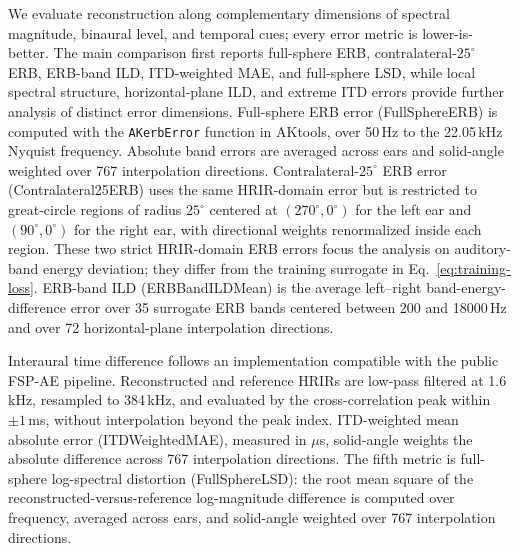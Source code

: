 \documentclass[UTF8,a4paper]{article}
\begin{document}
We evaluate reconstruction along complementary dimensions of spectral magnitude, binaural level, and temporal cues; every error metric is lower-is-better. The main comparison first reports full-sphere ERB, contralateral-$25^\circ$ ERB, ERB-band ILD, ITD-weighted MAE, and full-sphere LSD, while local spectral structure, horizontal-plane ILD, and extreme ITD errors provide further analysis of distinct error dimensions. Full-sphere ERB error (FullSphereERB) is computed with the \texttt{AKerbError} function in AKtools\cite{R12}, over 50\,Hz to the 22.05\,kHz Nyquist frequency. Absolute band errors are averaged across ears and solid-angle weighted over 767 interpolation directions. Contralateral-$25^\circ$ ERB error (Contralateral25ERB) uses the same HRIR-domain error but is restricted to great-circle regions of radius $25^\circ$ centered at $(270^\circ,0^\circ)$ for the left ear and $(90^\circ,0^\circ)$ for the right ear, with directional weights renormalized inside each region. These two strict HRIR-domain ERB errors focus the analysis on auditory-band energy deviation; they differ from the training surrogate in Eq.~\eqref{eq:training-loss}. ERB-band ILD (ERBBandILDMean) is the average left--right band-energy-difference error over 35 surrogate ERB bands centered between 200 and 18000\,Hz and over 72 horizontal-plane interpolation directions.

Interaural time difference follows an implementation compatible with the public FSP-AE pipeline\cite{R4}. Reconstructed and reference HRIRs are low-pass filtered at 1.6\,kHz, resampled to 384\,kHz, and evaluated by the cross-correlation peak within $\pm1$\,ms, without interpolation beyond the peak index. ITD-weighted mean absolute error (ITDWeightedMAE), measured in $\mu$s, solid-angle weights the absolute difference across 767 interpolation directions. The fifth metric is full-sphere log-spectral distortion (FullSphereLSD): the root mean square of the reconstructed-versus-reference log-magnitude difference is computed over frequency, averaged across ears, and solid-angle weighted over 767 interpolation directions.
\end{document}
